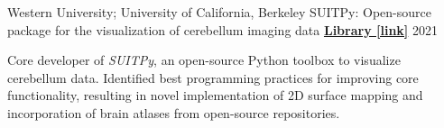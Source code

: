
\begin{cventries}
    
  \cventry
  	{Western University; University of California, Berkeley}
  	{SUITPy: Open-source package for the visualization of cerebellum imaging data} %
  	{\href{https://suitpy.readthedocs.io/en/latest/}{\textbf{Library [link]}}}
  	{2021} %
    {
      \begin{cvitems} %
      	\item {Core developer of \textit{SUITPy}, an open-source Python toolbox to visualize cerebellum data. Identified best programming practices for improving core functionality, resulting in novel implementation of 2D surface mapping and incorporation of brain atlases from open-source repositories.}
      \end{cvitems}
    }
    
    

\end{cventries}
